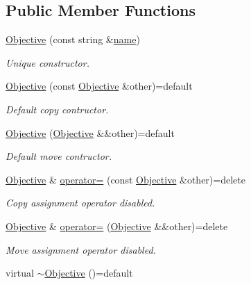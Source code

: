 \subsection*{Public Member Functions}
\begin{DoxyCompactItemize}
\item 
\hyperlink{classghost_1_1Objective_a30a595b146555401e98f51b5a1ef5bfb}{Objective} (const string \&\hyperlink{classghost_1_1Objective_af5bf0605c193884ad7f53593dabe8b85}{name})
\begin{DoxyCompactList}\small\item\em Unique constructor. \end{DoxyCompactList}\item 
\hyperlink{classghost_1_1Objective_a7e2305f59de130a75785a1dc9269d7ae}{Objective} (const \hyperlink{classghost_1_1Objective}{Objective} \&other)=default
\begin{DoxyCompactList}\small\item\em Default copy contructor. \end{DoxyCompactList}\item 
\hyperlink{classghost_1_1Objective_ae9d567c78a9df7aeae4f8bea71e54b56}{Objective} (\hyperlink{classghost_1_1Objective}{Objective} \&\&other)=default
\begin{DoxyCompactList}\small\item\em Default move contructor. \end{DoxyCompactList}\item 
\hyperlink{classghost_1_1Objective}{Objective} \& \hyperlink{classghost_1_1Objective_adaedfb85e62325aaa1ce766e60c93d77}{operator=} (const \hyperlink{classghost_1_1Objective}{Objective} \&other)=delete
\begin{DoxyCompactList}\small\item\em Copy assignment operator disabled. \end{DoxyCompactList}\item 
\hyperlink{classghost_1_1Objective}{Objective} \& \hyperlink{classghost_1_1Objective_a5682a026b25d9ca93cacf3d19f5ef0ec}{operator=} (\hyperlink{classghost_1_1Objective}{Objective} \&\&other)=delete
\begin{DoxyCompactList}\small\item\em Move assignment operator disabled. \end{DoxyCompactList}\item 
virtual \hyperlink{classghost_1_1Objective_a9b288b785eb9abd31389adffe0e82716}{$\sim$\+Objective} ()=default
\item 

\end{DoxyCompactItemize}
